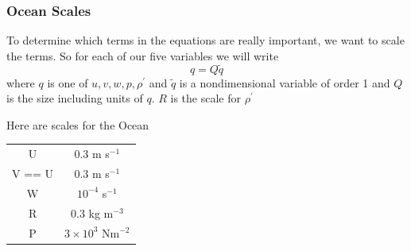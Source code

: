 \documentclass[xcolor=dvipsnames]{beamer}
\begin{document}
\begin{frame}
  \frametitle{Ocean Scales}   %

To determine which terms in the equations are really important, we want to scale the terms.  So for each of our five variables we will write
\[ q = Q \tilde q \]
where $q$ is one of $u,v,w,p,\rho^\prime$ and $\tilde q$ is a nondimensional variable of order 1 and $Q$ is the size including units of $q$.  $R$ is the scale for $\rho^\prime$

Here are scales for the Ocean\\ \vspace{0.2in}

\begin{center}
\begin{tabular}{cc}
\hline
U & 0.3 m s$^{-1}$\\
V == U & 0.3 m s$^{-1}$\\
W & $10^{-4}$  s$^{-1}$\\
R & 0.3 kg m$^{-3}$\\
P & $3 \times 10^3$ Nm$^{-2}$\\
\hline
\end{tabular}
\end{center}
\end{frame}
\end{document}
